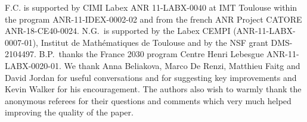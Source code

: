 \documentclass[pdftex]{sigma}
\numberwithin{equation}{section}
\numberwithin{theorem}{section}
\numberwithin{proposition}{section}
\numberwithin{definition}{section}
\numberwithin{lemma}{section}
\numberwithin{corollary}{section}
\numberwithin{remark}{section}
\numberwithin{example}{section}
\begin{document}
F.C. is supported by CIMI Labex ANR
11-LABX-0040 at IMT Toulouse within the program ANR-11-IDEX-0002-02
and from the french ANR Project CATORE ANR-18-CE40-0024. N.G.\ is
supported by the Labex CEMPI (ANR-11-LABX-0007-01), Institut de
Math\'ematiques de Toulouse and by the NSF grant DMS-2104497. B.P.\ thanks the France 2030 program Centre Henri Lebesgue ANR-11-LABX-0020-01.
We thank Anna Beliakova, Marco De Renzi, Matthieu Faitg and David Jordan for useful conversations and for suggesting key improvements and Kevin Walker for his encouragement.
The authors also wish to warmly thank the anonymous referees for their questions and comments which very much helped improving the quality of the paper.


\end{document}
